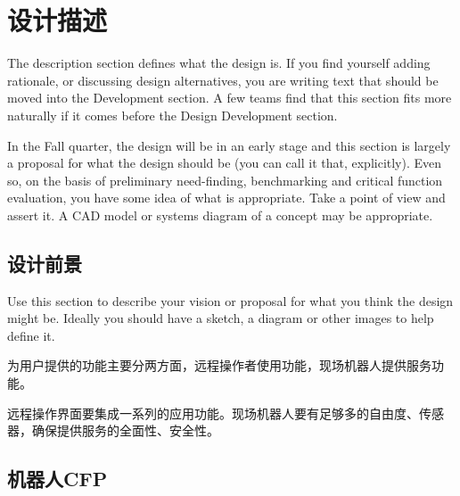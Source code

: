 \chapter{设计描述}
\label{design-description}

\begin{remark}\color{blue}
The description section defines what the design is. If you find yourself adding rationale, or discussing design alternatives, you are writing text that should be moved into the Development section. A few teams find that this section fits more naturally if it comes before the Design Development section.

In the Fall quarter, the design will be in an early stage and this section is largely a proposal for what the design should be (you can call it that, explicitly). Even so, on the basis of preliminary need-finding, benchmarking and critical function evaluation, you have some idea of what is appropriate. Take a point of view and assert it. A CAD model or systems diagram of a concept may be appropriate.
\normalcolor \end{remark}

\section{设计前景}
\label{设计前景}

\begin{remark}\color{blue}
Use this section to describe your vision or proposal for what you think the design might be. Ideally you should have a sketch, a diagram or other images to help define it.
\normalcolor
\end{remark}


为用户提供的功能主要分两方面，远程操作者使用功能，现场机器人提供服务功能。

远程操作界面要集成一系列的应用功能。现场机器人要有足够多的自由度、传感器，确保提供服务的全面性、安全性。

\section{机器人CFP}


